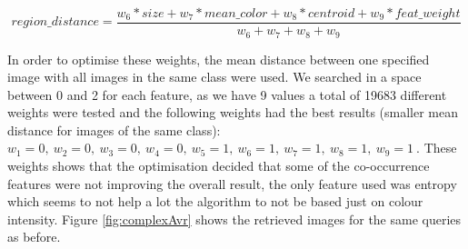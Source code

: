 \documentclass[12pt,a4paper]{article}
\begin{document}
\begin{equation}
region\_distance =  \frac{w_6 * size + w_7 * mean\_color + w_8 * centroid +  w_9 * feat\_weight}{w_6 + w_7 + w_8 + w_9}
\label{eq:complex_feat}
\end{equation}


In order to optimise these weights, the mean distance between one specified image with all images in the same class were used. We searched in a space between 0 and 2 for each feature, as we have 9 values a total of 19683 different weights were tested and the following weights had the best results (smaller mean distance for images of the same class): $w_1 = 0, \ w_2 = 0, \ w_3 = 0, \ w_4 = 0, \ w_5 = 1, \ w_6 = 1, \ w_7 = 1, \ w_8 = 1, \ w_9 = 1 \ $. These weights shows that the optimisation decided that some of the co-occurrence features were not improving the overall result, the only feature used was entropy which seems to not help a lot the algorithm to not be based just on colour intensity. Figure \ref{fig:complexAvr} shows the retrieved images for the same queries as before. \\
\end{document}
